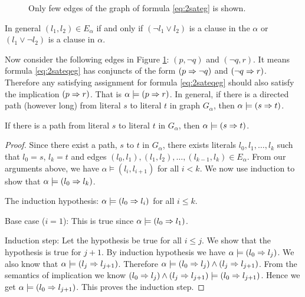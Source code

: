 \begin{figure}[!h]
  \centering
  \caption{Only few edges of the graph of formula \ref{eq:2sateg} is shown.}
  \label{fig:2satcycle}
\end{figure}

In general $(l_1,l_2) \in E_{\alpha}$ if and only if $(\neg l_1 \vee l_2)$ is a clause in the $\alpha$ or $(l_1 \vee \neg l_2)$ is a clause in $\alpha$.

Now consider the following edges in Figure \ref{fig:2satcycle}: $(p,\neg q)$ and $(\neg q,r)$. It means formula \ref{eq:2sateqeg} has conjuncts of the form $(p \Rightarrow \neg q)$ and $(\neg q \Rightarrow r)$. Therefore any satisfying assignment for formula \ref{eq:2sateqeg} should also satisfy the implication $(p \Rightarrow r)$. That is $\alpha \models (p \Rightarrow r)$. In general, if there is a directed path (however long) from literal $s$ to literal $t$ in graph $G_{\alpha}$, then $\alpha \models (s \Rightarrow t)$. 
\begin{claim}
\label{claim:pathimpl}
If there is a path from literal $s$ to literal $t$ in $G_{\alpha}$, then $\alpha \models (s \Rightarrow t)$.
\end{claim}
\begin{proof}
Since there exist a path, $s$ to $t$ in $G_{\alpha}$, there exists literals $l_0, l_1,\dots, l_k$ such that $l_0=s$, $l_k=t$ and edges $(l_0,l_1),(l_1,l_2),\dots,(l_{k-1},l_k) \in E_{\alpha}$. From our arguments above, we have $\alpha \models (l_i,l_{i+1})$ for all $i < k$. We now use induction to show that $\alpha \models (l_0 \Rightarrow l_k)$. 

The induction hypothesis: $\alpha \models (l_0 \Rightarrow l_i)$ for all $i \leq k$.

Base case ($i=1$): This is true since $\alpha \models (l_0 \Rightarrow l_1)$. 

Induction step: Let the hypothesis be true for all $i\leq j$. We show that the  hypothesis is true for $j+1$. By induction hypothesis we have $\alpha \models (l_0 \Rightarrow l_j)$. We also know that $\alpha \models (l_j \Rightarrow l_{j+1})$. Therefore $\alpha \models (l_0 \Rightarrow l_j) \wedge (l_j \Rightarrow l_{j+1})$. From the semantics of implication we know $(l_0 \Rightarrow l_j) \wedge (l_j \Rightarrow l_{j+1}) \models (l_0 \Rightarrow l_{j+1})$. Hence we get $\alpha\models (l_0 \Rightarrow l_{j+1})$. This proves the induction step.
\end{proof}

